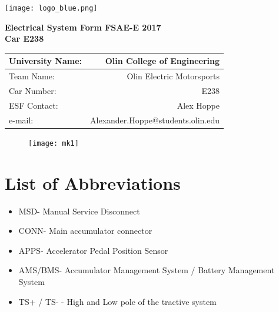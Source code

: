 \documentclass{article}
\begin{document}
\renewcommand{\headrulewidth}{0pt}
\chead{}
\rhead{} %
{}
\rfoot{\thepage}

\begin{titlepage}

    \centering
    \vfill
    \texttt{[image: logo\_blue.png]}

    {\bfseries\Large
        \vskip3cm
        Electrical System Form FSAE-E 2017\\
        Car E238\\
    }

    \begin{table}[H]
        \centering
        \label{my-label}
        \begin{tabular}{lr}
        University Name: & Olin College of Engineering \\ \hline
        Team Name: & Olin Electric Motorsports \\ \hline
        Car Number: & E238 \\ \hline
        ESF Contact: & Alex Hoppe \\ \hline
        e-mail: & Alexander.Hoppe@students.olin.edu \\ \hline
        \end{tabular}
    \end{table}
\vfill

\begin{figure}[H]
\centering
\texttt{[image: mk1]}
\end{figure}

\end{titlepage}

\tableofcontents
{}

\newpage
\listoffigures
{}

\newpage
\listoftables
{}

\newpage
\section*{List of Abbreviations} \label{list_of_abbreviations}
\begin{itemize}
    \item MSD- Manual Service Disconnect
    \item CONN- Main accumulator connector
    \item APPS- Accelerator Pedal Position Sensor
    \item AMS/BMS- Accumulator Management System / Battery Management System
    \item TS+ / TS- - High and Low pole of the tractive system  
\end{itemize}
\end{document}
